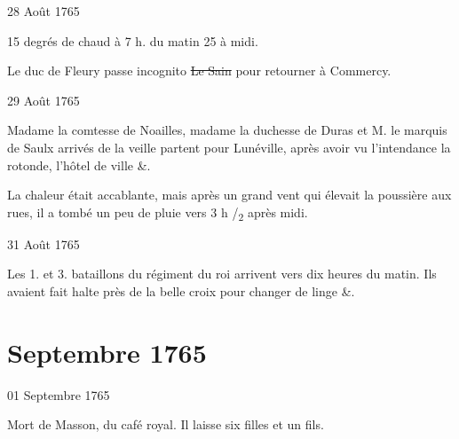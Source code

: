                      \begin{diary}{28 Août 1765}{}


                           15 degrés de chaud à 7 h. du matin
                           25 à midi. \bigskip



                           Le duc de Fleury passe incognito
                           \sout{Le Sain} pour retourner à Commercy. \bigskip


                     \end{diary}


                     \begin{diary}{29 Août 1765}{}


                           Madame la comtesse de Noailles, madame la duchesse de
                              Duras et M. le marquis de Saulx arrivés de la
                           veille partent pour Lunéville, après avoir
                           vu l'intendance la rotonde, l'hôtel de
                              ville \&. \bigskip


                         La chaleur était accablante,
                           mais après
                           un grand vent qui élevait la poussière aux
                           rues, il a tombé un peu de pluie vers
                           3 h /\textsubscript{2}
                           après midi. \bigskip


                     \end{diary}

                     \begin{diary}{31 Août 1765}{}

                         Les 1. et
                              3. bataillons du régiment
                              du roi arrivent vers dix heures du
                           matin. Ils avaient fait
                           halte près de la
                           belle croix pour changer de linge \&. \bigskip


                     \end{diary}
                  \chapter*{Septembre 1765}




                     \begin{diary}{01 Septembre 1765}{}

                         Mort de Masson, du café
                              royal. Il laisse
                           six filles et un fils. \bigskip


                     \end{diary}

